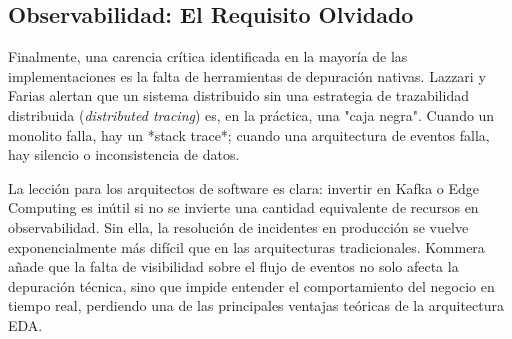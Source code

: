 \subsection{Observabilidad: El Requisito Olvidado}
Finalmente, una carencia crítica identificada en la mayoría de las implementaciones es la falta de herramientas de depuración nativas. Lazzari y Farias \cite{lazzari2023hidden} alertan que un sistema distribuido sin una estrategia de trazabilidad distribuida (\textit{distributed tracing}) es, en la práctica, una "caja negra". Cuando un monolito falla, hay un *stack trace*; cuando una arquitectura de eventos falla, hay silencio o inconsistencia de datos.

La lección para los arquitectos de software es clara: invertir en Kafka o Edge Computing \cite{salamon2018gateway} es inútil si no se invierte una cantidad equivalente de recursos en observabilidad. Sin ella, la resolución de incidentes en producción se vuelve exponencialmente más difícil que en las arquitecturas tradicionales. Kommera \cite{kommera2020power} añade que la falta de visibilidad sobre el flujo de eventos no solo afecta la depuración técnica, sino que impide entender el comportamiento del negocio en tiempo real, perdiendo una de las principales ventajas teóricas de la arquitectura EDA.